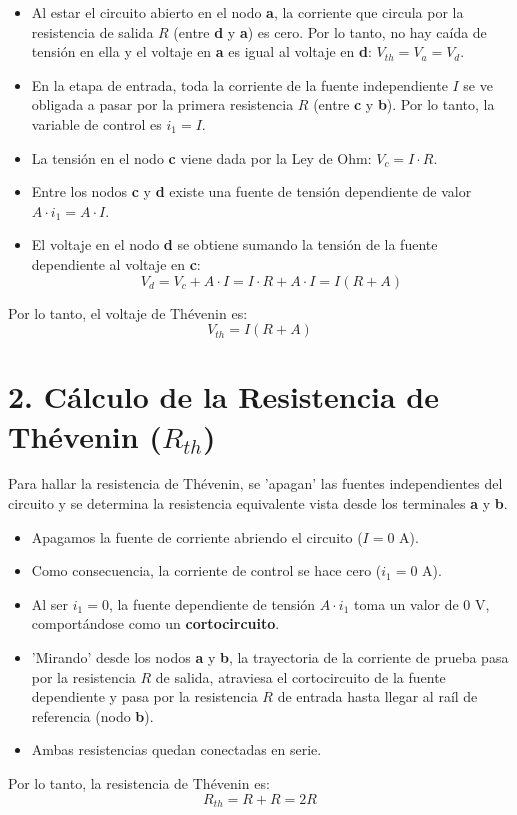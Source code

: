 \documentclass[12pt, a4paper]{article}
\begin{document}
\begin{itemize}
    \item Al estar el circuito abierto en el nodo \textbf{a}, la corriente que circula por la resistencia de salida $R$ (entre \textbf{d} y \textbf{a}) es cero. Por lo tanto, no hay caída de tensión en ella y el voltaje en \textbf{a} es igual al voltaje en \textbf{d}: $V_{th} = V_a = V_d$.
    \item En la etapa de entrada, toda la corriente de la fuente independiente $I$ se ve obligada a pasar por la primera resistencia $R$ (entre \textbf{c} y \textbf{b}). Por lo tanto, la variable de control es $i_1 = I$.
    \item La tensión en el nodo \textbf{c} viene dada por la Ley de Ohm: $V_c = I \cdot R$.
    \item Entre los nodos \textbf{c} y \textbf{d} existe una fuente de tensión dependiente de valor $A \cdot i_1 = A \cdot I$.
    \item El voltaje en el nodo \textbf{d} se obtiene sumando la tensión de la fuente dependiente al voltaje en \textbf{c}:
    \begin{equation*}
        V_d = V_c + A \cdot I = I \cdot R + A \cdot I = I(R + A)
    \end{equation*}
\end{itemize}
Por lo tanto, el voltaje de Thévenin es:
\begin{equation}
    V_{th} = I(R + A)
\end{equation}

\section*{2. Cálculo de la Resistencia de Thévenin ($R_{th}$)}
Para hallar la resistencia de Thévenin, se 'apagan' las fuentes independientes del circuito y se determina la resistencia equivalente vista desde los terminales \textbf{a} y \textbf{b}.

\begin{itemize}
    \item Apagamos la fuente de corriente abriendo el circuito ($I = 0 \text{ A}$).
    \item Como consecuencia, la corriente de control se hace cero ($i_1 = 0 \text{ A}$).
    \item Al ser $i_1 = 0$, la fuente dependiente de tensión $A \cdot i_1$ toma un valor de $0 \text{ V}$, comportándose como un \textbf{cortocircuito}.
    \item 'Mirando' desde los nodos \textbf{a} y \textbf{b}, la trayectoria de la corriente de prueba pasa por la resistencia $R$ de salida, atraviesa el cortocircuito de la fuente dependiente y pasa por la resistencia $R$ de entrada hasta llegar al raíl de referencia (nodo \textbf{b}).
    \item Ambas resistencias quedan conectadas en serie.
\end{itemize}
Por lo tanto, la resistencia de Thévenin es:
\begin{equation}
    R_{th} = R + R = 2R
\end{equation}
\end{document}
